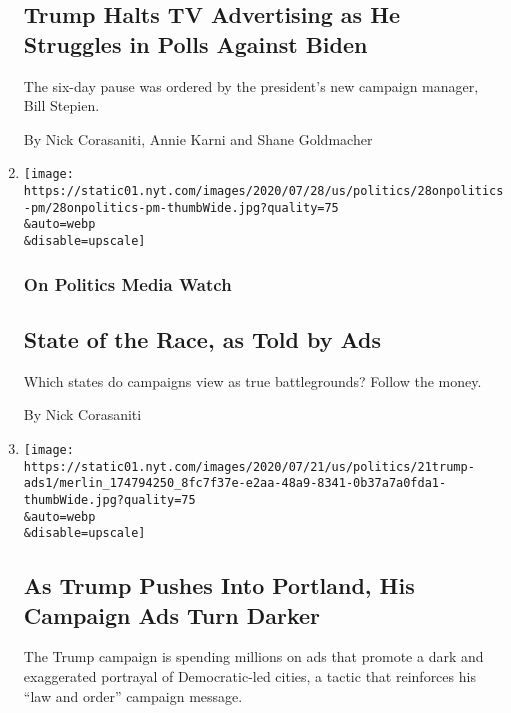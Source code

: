 \begin{enumerate}
  \hypertarget{trump-halts-tv-advertising-as-he-struggles-in-polls-against-biden}{%
  \subsection{Trump Halts TV Advertising as He Struggles in Polls
  Against
  Biden}\label{trump-halts-tv-advertising-as-he-struggles-in-polls-against-biden}}

  The six-day pause was ordered by the president's new campaign manager,
  Bill Stepien.

  By Nick Corasaniti, Annie Karni and Shane Goldmacher
\item
  \href{/2020/07/28/us/politics/campaign-ad-buys.html}{}

  \texttt{[image: https://static01.nyt.com/images/2020/07/28/us/politics/28onpolitics-pm/28onpolitics-pm-thumbWide.jpg?quality=75\\\&auto=webp\\\&disable=upscale]}

  \hypertarget{on-politics-media-watch-1}{%
  \subsubsection{On Politics Media
  Watch}\label{on-politics-media-watch-1}}

  \hypertarget{state-of-the-race-as-told-by-ads}{%
  \subsection{State of the Race, as Told by
  Ads}\label{state-of-the-race-as-told-by-ads}}

  Which states do campaigns view as true battlegrounds? Follow the
  money.

  By Nick Corasaniti
\item
  \href{/2020/07/21/us/politics/trump-portland-federal-agents.html}{}

  \texttt{[image: https://static01.nyt.com/images/2020/07/21/us/politics/21trump-ads1/merlin\_174794250\_8fc7f37e-e2aa-48a9-8341-0b37a7a0fda1-thumbWide.jpg?quality=75\\\&auto=webp\\\&disable=upscale]}

  \hypertarget{as-trump-pushes-into-portland-his-campaign-ads-turn-darker}{%
  \subsection{As Trump Pushes Into Portland, His Campaign Ads Turn
  Darker}\label{as-trump-pushes-into-portland-his-campaign-ads-turn-darker}}

  The Trump campaign is spending millions on ads that promote a dark and
  exaggerated portrayal of Democratic-led cities, a tactic that
  reinforces his ``law and order'' campaign message.


\end{enumerate}
